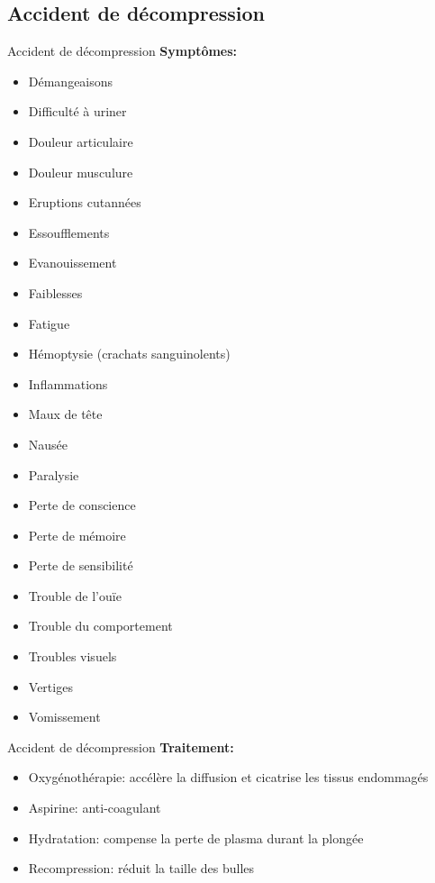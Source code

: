 \subsection{Accident de décompression}

\begin{frame}{Accident de décompression}  
	\textbf{Symptômes:}
	\begin{multicols}{2}
		\begin{itemize}
			\item Démangeaisons
			\item Difficulté à uriner
			\item Douleur articulaire
			\item Douleur musculure
			\item Eruptions cutannées
			\item Essoufflements
			\item Evanouissement
			\item Faiblesses
			\item Fatigue
			\item Hémoptysie (crachats sanguinolents)
			\item Inflammations
			\item Maux de tête
			\item Nausée
			\item Paralysie
			\item Perte de conscience
			\item Perte de mémoire
			\item Perte de sensibilité
			\item Trouble de l'ouïe
			\item Trouble du comportement
			\item Troubles visuels
			\item Vertiges
			\item Vomissement
		\end{itemize}
	\end{multicols}
\end{frame}

\begin{frame}{Accident de décompression}
	\textbf{Traitement:}
	\begin{itemize}
		\item Oxygénothérapie: accélère la diffusion et cicatrise les tissus endommagés
		\item Aspirine: anti-coagulant
		\item Hydratation: compense la perte de plasma durant la plongée
		\item Recompression: réduit la taille des bulles
	\end{itemize}
\end{frame}

